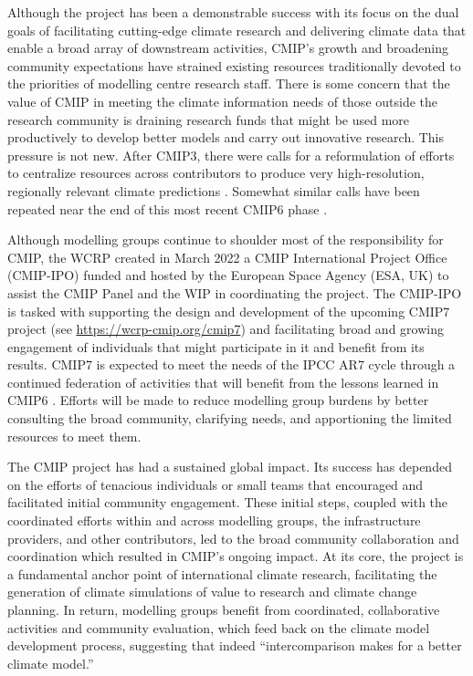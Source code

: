 \documentclass[manuscript]{copernicus}
\begin{document}
Although the project has been a demonstrable success with its focus on the dual goals of facilitating cutting-edge climate research and delivering climate data that enable a broad array of downstream activities, CMIP's growth and broadening community expectations have strained existing resources traditionally devoted to the priorities of modelling centre research staff. There is some concern that the value of CMIP in meeting the climate information needs of those outside the research community is draining research funds that might be used more productively to develop better models and carry out innovative research. This pressure is not new. After CMIP3, there were calls for a reformulation of efforts to centralize resources across contributors to produce very high-resolution, regionally relevant climate predictions \citep{shukla_strategies_2009,shukla_toward_2010}. Somewhat similar calls have been repeated near the end of this most recent CMIP6 phase \citep{jakob_need_2023,stevens_perspective_2024}.

Although modelling groups continue to shoulder most of the responsibility for CMIP, the WCRP created in March 2022 a CMIP International Project Office (CMIP-IPO) funded and hosted by the European Space Agency (ESA, UK) to assist the CMIP Panel and the WIP in coordinating the project. The CMIP-IPO is tasked with supporting the design and development of the upcoming CMIP7 project (see \href{https://wcrp-cmip.org/cmip7}{https://wcrp-cmip.org/cmip7}) and facilitating broad and growing engagement of individuals that might participate in it and benefit from its results. CMIP7 is expected to meet the needs of the IPCC AR7 cycle through a continued federation of activities that will benefit from the lessons learned in CMIP6 \citep{eyring_overview_2016}. Efforts will be made to reduce modelling group burdens by better consulting the broad community, clarifying needs, and apportioning the limited resources to meet them. 

The CMIP project has had a sustained global impact. Its success has depended on the efforts of tenacious individuals or small teams that encouraged and facilitated initial community engagement. These initial steps, coupled with the coordinated efforts within and across modelling groups, the infrastructure providers, and other contributors, led to the broad community collaboration and coordination which resulted in CMIP's ongoing impact. At its core, the project is a fundamental anchor point of international climate research, facilitating the generation of climate simulations of value to research and climate change planning. In return, modelling groups benefit from coordinated, collaborative activities and community evaluation, which feed back on the climate model development process, suggesting that indeed ``intercomparison makes for a better climate model.''
\end{document}
